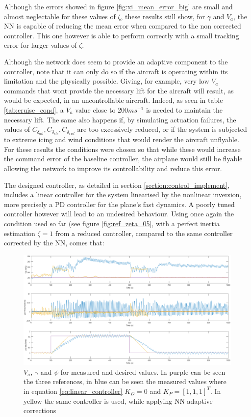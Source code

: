 Although the errors showed in figure \ref{fig:xi_mean_error_big} are small and almost neglectable for these values of $\zeta$, these results still show, for $\gamma$ and $V_a$, the NN is capable of reducing the mean error when compared to the non corrected controller. This one however is able to perform correctly with a small tracking error for larger values of $\zeta$.

Although the network does seem to provide an adaptive component to the controller, note that it can only do so if the aircraft is operating within its limitation and the physically possible. Giving, for example, very low $V_a$ commands that wont provide the necessary lift for the aircraft will result, as would be expected, in an uncontrollable aircraft. Indeed, as seen in table \ref{tab:cruise_cond}, a $V_a$ value close to $200ms^{-1}$ is needed to maintain the necessary lift. The same also happens if, by simulating actuation failures, the values of $C_{\delta_{ail}}, C_{\delta_{ele}}, C_{\delta_{rud}}$ are too excessively reduced, or if the system is subjected to extreme icing and wind conditions that would render the aircraft unflyable. For these results the conditions were chosen so that while these would increase the command error of the baseline controller, the airplane would still be flyable allowing the network to improve its controllability and reduce this error.

The designed controller, as detailed in section \ref{section:control_implement}, includes a linear controller for the system linearised by the nonlinear inversion, more precisely a PD controller for the plane's fast dynamics. A poorly tuned controller however will lead to an undesired behaviour. Using once again the condition used so far (see figure \ref{fig:ref_zeta_05}, with a perfect inertia estimation $\zeta = 1$ from a reduced controller, compared to the same controller corrected by the NN, comes that:

\begin{figure}[h]
\centering
\includegraphics[width=1.1\textwidth]{Figures/Results/ref_bad_control.png}
\caption[Poorly tuned controller comparison]{$V_a$, $\gamma$ and $\psi$ for measured and desired values. In purple can be seen the three references, in blue can be seen the measured values where in equation \ref{eq:linear_controller} $K_D=0$ and $K_P = [1,1,1]^T$. In yellow the same controller is used, while applying NN adaptive corrections}
\label{fig:ref_bad_control}
\end{figure}

